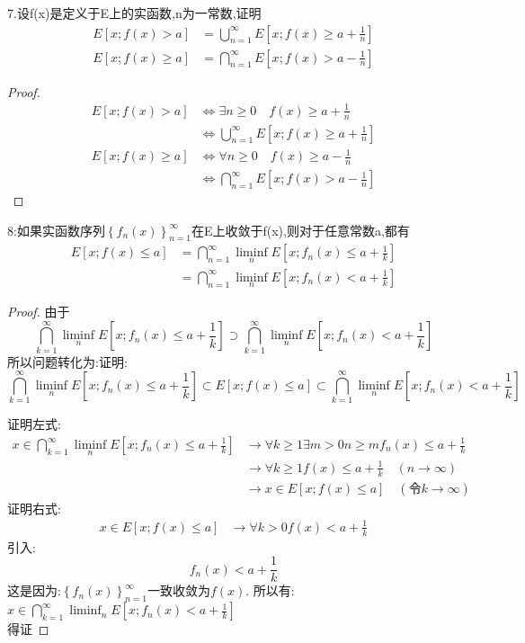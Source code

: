 7.设f(x)是定义于E上的实函数,n为一常数,证明 \begin{align*}
    E[x; f(x) >a] &= \bigcup\limits_{n=1}^{\infty} E [x ; f(x) \geq a+ \frac{1}{n}] \\ 
    E[x;f(x) \geq a] &= \bigcap\limits_{n=1}^{\infty} E[x; f(x) > a- \frac{1}{n}] 
\end{align*}
\begin{proof}
    \begin{align*}
        E[x;f(x)>a] &\Leftrightarrow \exists n \geq 0  \quad f(x) \geq a + \frac{1}{n} \\ 
        &\Leftrightarrow \bigcup\limits_{n=1}^{\infty} E[x ; f(x) \geq a+ \frac{1}{n}]
    \end{align*}
    \begin{align*}
        E[x ; f(x) \geq a ] &\Leftrightarrow \forall  n \geq 0 \quad f(x) \geq a - \frac{1}{n} \\
        &\Leftrightarrow \bigcap\limits_{n=1}^{\infty} E[x ; f(x) > a -\frac{1}{n}]
    \end{align*}
\end{proof}
8:如果实函数序列\(\left\{f_n(x)\right\}^{\infty}_{n=1}\)在E上收敛于f(x),则对于任意常数a,都有
\begin{align*}
    E[x;f(x) \leq a] &= \bigcap\limits_{n=1}^{\infty}\liminf_{n}E[x; f_n (x) \leq a+ \frac{1}{k}] \\ 
    &= \bigcap\limits_{n=1}^{\infty}\liminf_{n}E[x; f_n (x) < a+ \frac{1}{k}]
\end{align*}
\begin{proof}
    由于\[\bigcap\limits_{k=1}^{\infty}\liminf_{n}E[x; f_n (x) \leq a+ \frac{1}{k}] \supset \bigcap\limits_{k=1}^{\infty}\liminf_{n}E[x; f_n (x) < a+ \frac{1}{k}] \]
    所以问题转化为:证明:\[ \bigcap\limits_{k=1}^{\infty}\liminf_{n}E[x; f_n (x) \leq a+ \frac{1}{k}] \subset E[x ; f(x) \leq a] \subset \bigcap\limits_{k=1}^{\infty}\liminf_{n}E[x; f_n (x) < a+ \frac{1}{k}]\]
    
    证明左式:
    \begin{align*}
        x \in \bigcap\limits_{k=1}^{\infty}\liminf_{n}E[x; f_n (x) \leq a+ \frac{1}{k}] &\rightarrow \forall k \geq 1 \exists m >0 n\geq m  f_n(x)\leq a+\frac{1}{k} \\
            &\rightarrow \forall k \geq 1 f(x) \leq a+\frac{1}{k} \quad(n \rightarrow \infty) \\ 
            &\rightarrow  x \in E[x ; f(x) \leq a] \quad (\text{令}k \rightarrow \infty)
    \end{align*}
    证明右式:
    \begin{align*}
        x \in E[x ; f(x) \leq a ] &\rightarrow \forall k >0 f(x) < a + \frac{1}{k} 
    \end{align*}
    引入: \[f_n(x) < a + \frac{1}{k}\]
    这是因为:\(\left\{f_n(x)\right\}_{n=1}^{\infty} \)一致收敛为\(f(x)\).
    所以有: \(x \in \bigcap\limits_{k=1}^{\infty}\liminf_{n}E[x; f_n (x) < a+ \frac{1}{k}]\)
    \\
    得证
\end{proof}
